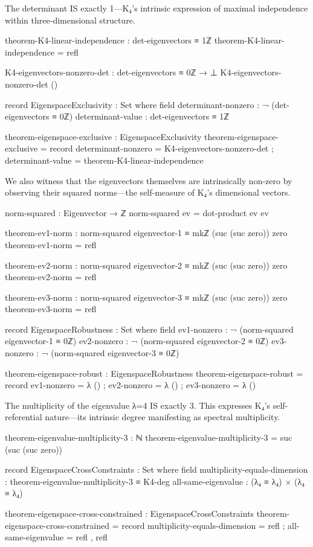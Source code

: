 \documentclass[11pt,a4paper]{book}
\begin{document}
The determinant IS exactly 1—K₄'s intrinsic expression of maximal independence within three-dimensional structure.

\begin{code}
theorem-K4-linear-independence : det-eigenvectors ≡ 1ℤ
theorem-K4-linear-independence = refl

K4-eigenvectors-nonzero-det : det-eigenvectors ≡ 0ℤ → ⊥
K4-eigenvectors-nonzero-det ()

record EigenspaceExclusivity : Set where
  field
    determinant-nonzero : ¬ (det-eigenvectors ≡ 0ℤ)
    determinant-value   : det-eigenvectors ≡ 1ℤ

theorem-eigenspace-exclusive : EigenspaceExclusivity
theorem-eigenspace-exclusive = record
  { determinant-nonzero = K4-eigenvectors-nonzero-det
  ; determinant-value = theorem-K4-linear-independence
  }

\end{code}

We also witness that the eigenvectors themselves are intrinsically non-zero by observing their squared norms—the self-measure of K₄'s dimensional vectors.

\begin{code}
norm-squared : Eigenvector → ℤ
norm-squared ev = dot-product ev ev

theorem-ev1-norm : norm-squared eigenvector-1 ≡ mkℤ (suc (suc zero)) zero
theorem-ev1-norm = refl

theorem-ev2-norm : norm-squared eigenvector-2 ≡ mkℤ (suc (suc zero)) zero
theorem-ev2-norm = refl

theorem-ev3-norm : norm-squared eigenvector-3 ≡ mkℤ (suc (suc zero)) zero
theorem-ev3-norm = refl

record EigenspaceRobustness : Set where
  field
    ev1-nonzero : ¬ (norm-squared eigenvector-1 ≡ 0ℤ)
    ev2-nonzero : ¬ (norm-squared eigenvector-2 ≡ 0ℤ)
    ev3-nonzero : ¬ (norm-squared eigenvector-3 ≡ 0ℤ)

theorem-eigenspace-robust : EigenspaceRobustness
theorem-eigenspace-robust = record
  { ev1-nonzero = λ ()
  ; ev2-nonzero = λ ()
  ; ev3-nonzero = λ ()
  }

\end{code}

The multiplicity of the eigenvalue λ=4 IS exactly 3. This expresses K₄'s self-referential nature—its intrinsic degree manifesting as spectral multiplicity.

\begin{code}
theorem-eigenvalue-multiplicity-3 : ℕ
theorem-eigenvalue-multiplicity-3 = suc (suc (suc zero))

record EigenspaceCrossConstraints : Set where
  field
    multiplicity-equals-dimension : theorem-eigenvalue-multiplicity-3 ≡ K4-deg
    all-same-eigenvalue : (λ₄ ≡ λ₄) × (λ₄ ≡ λ₄)

theorem-eigenspace-cross-constrained : EigenspaceCrossConstraints  
theorem-eigenspace-cross-constrained = record
  { multiplicity-equals-dimension = refl
  ; all-same-eigenvalue = refl , refl
  }

\end{code}
\end{document}
